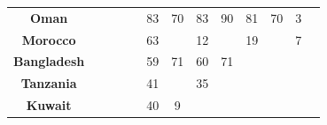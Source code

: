 {\begin{table}
\begin{tabular}{|c|cc|cc|cc|cc|cc|cc|}
    \textbf{Oman}                                 &    &                                                                                        &    &                                                                                             & 83 & 70                                                                                          & 83 & 90                                  & 81 & 70                                                                                         & 3  &                               \\
    \textbf{Morocco}                              &    &                                                                                        &    &                                                                                             & 63 &                                                                                             & 12 &                                     & 19 &                                                                                            & 7  &                               \\
    \textbf{Bangladesh}                           &    &                                                                                        &    &                                                                                             & 59 & 71                                                                                          & 60 & 71                                  &    &                                                                                            &    &                               \\
    \textbf{Tanzania}                             &    &                                                                                        &    &                                                                                             & 41 &                                                                                             & 35 &                                     &    &                                                                                            &    &                               \\
    \textbf{Kuwait}                               &    &                                                                                        &    &                                                                                             & 40 & 9                                                                                           &    &                                     &    &                                                                                            &    &                               \\

\end{tabular}
\end{table}}
